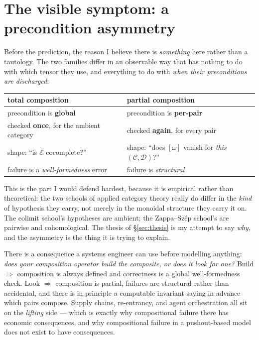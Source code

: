 \documentclass[11pt]{article}
\theoremstyle{plain}
\theoremstyle{definition}
\theoremstyle{remark}
\begin{document}
\section{The visible symptom: a precondition asymmetry}\label{sec:asym}

Before the prediction, the reason I believe there is \emph{something} here rather
than a tautology. The two families differ in an observable way that has nothing to do
with which tensor they use, and everything to do with \emph{when their preconditions
are discharged}:

\begin{center}
\begin{tabular}{@{}ll@{}}
\toprule
\textbf{total composition} & \textbf{partial composition} \\
\midrule
precondition is \textbf{global} & precondition is \textbf{per-pair} \\
checked \textbf{once}, for the ambient category & checked \textbf{again}, for every pair \\
shape: ``is $\mathcal E$ cocomplete?'' & shape: ``does $[\omega]$ vanish for \emph{this} $(\mathcal C,\mathcal D)$?'' \\
failure is a \emph{well-formedness} error & failure is \emph{structural} \\
\bottomrule
\end{tabular}
\end{center}

\medskip

This is the part I would defend hardest, because it is empirical rather than
theoretical: the two schools of applied category theory really do differ in the
\emph{kind} of hypothesis they carry, not merely in the monoidal structure they
carry it on. The colimit school's hypotheses are ambient; the Zappa--Sz\'ep school's
are pairwise and cohomological. The thesis of \S\ref{sec:thesis} is my attempt to say
\emph{why}, and the asymmetry is the thing it is trying to explain.

There is a consequence a systems engineer can use before modelling anything: \emph{does
your composition operator build the composite, or does it look for one?} Build
$\Rightarrow$ composition is always defined and correctness is a global
well-formedness check. Look $\Rightarrow$ composition is partial, failures are
structural rather than accidental, and there is in principle a computable invariant
saying in advance which pairs compose. Supply chains, re-entrancy, and agent
orchestration all sit on the \emph{lifting} side --- which is exactly why
compositional failure there has economic consequences, and why compositional failure
in a pushout-based model does not exist to have consequences.
\end{document}
